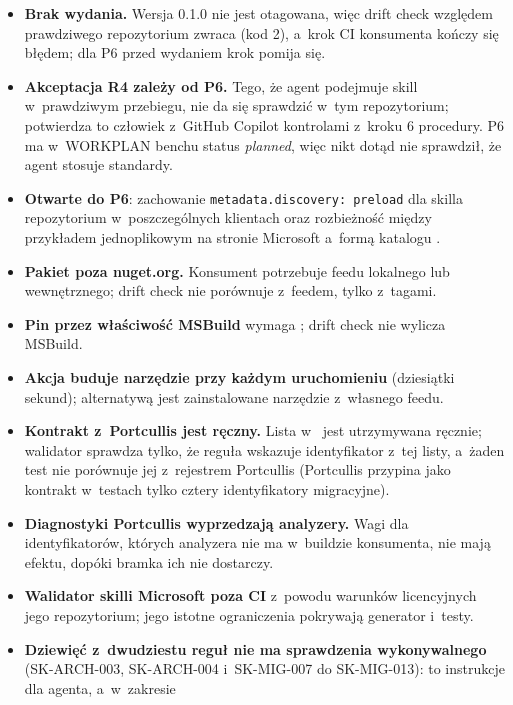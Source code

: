 \begin{itemize}
  \item \textbf{Brak wydania.} Wersja 0.1.0 nie jest otagowana, więc drift check względem
        prawdziwego repozytorium zwraca  (kod 2), a~krok CI konsumenta
        kończy się błędem; dla P6 przed wydaniem krok pomija się.
  \item \textbf{Akceptacja R4 zależy od P6.} Tego, że agent podejmuje skill w~prawdziwym
        przebiegu, nie da się sprawdzić w~tym repozytorium; potwierdza to człowiek
        z~GitHub Copilot kontrolami z~kroku 6 procedury. P6 ma w~WORKPLAN benchu status
        \emph{planned}, więc nikt dotąd nie sprawdził, że agent stosuje standardy.
  \item \textbf{Otwarte do P6}: zachowanie \texttt{metadata.discovery: preload} dla skilla
        repozytorium w~poszczególnych klientach oraz rozbieżność między przykładem
        jednoplikowym na stronie Microsoft a~formą katalogu .
  \item \textbf{Pakiet poza nuget.org.} Konsument potrzebuje feedu lokalnego lub
        wewnętrznego; drift check nie porównuje z~feedem, tylko z~tagami.
  \item \textbf{Pin przez właściwość MSBuild} wymaga ; drift check
        nie wylicza MSBuild.
  \item \textbf{Akcja buduje narzędzie przy każdym uruchomieniu} (dziesiątki sekund);
        alternatywą jest zainstalowane narzędzie z~własnego feedu.
  \item \textbf{Kontrakt z~Portcullis jest ręczny.} Lista 
        w~ jest utrzymywana ręcznie; walidator sprawdza tylko, że reguła
        wskazuje identyfikator z~tej listy, a~żaden test nie porównuje jej z~rejestrem
        Portcullis (Portcullis przypina jako kontrakt w~testach tylko cztery identyfikatory
        migracyjne).
  \item \textbf{Diagnostyki Portcullis wyprzedzają analyzery.} Wagi dla identyfikatorów,
        których analyzera nie ma w~buildzie konsumenta, nie mają efektu, dopóki bramka ich nie
        dostarczy.
  \item \textbf{Walidator skilli Microsoft poza CI} z~powodu warunków licencyjnych jego
        repozytorium; jego istotne ograniczenia pokrywają generator i~testy.
  \item \textbf{Dziewięć z~dwudziestu reguł nie ma sprawdzenia wykonywalnego} (SK-ARCH-003,
        SK-ARCH-004 i~SK-MIG-007 do SK-MIG-013): to instrukcje dla agenta, a~w~zakresie

\end{itemize}
